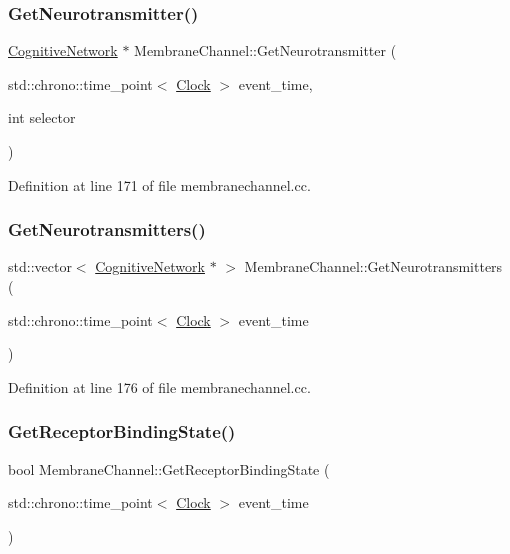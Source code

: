 \subsubsection{\texorpdfstring{Get\+Neurotransmitter()}{GetNeurotransmitter()}}
{\footnotesize\ttfamily \mbox{\hyperlink{class_cognitive_network}{Cognitive\+Network}} $\ast$ Membrane\+Channel\+::\+Get\+Neurotransmitter (\begin{DoxyParamCaption}\item[{std\+::chrono\+::time\+\_\+point$<$ \mbox{\hyperlink{universe_8h_a0ef8d951d1ca5ab3cfaf7ab4c7a6fd80}{Clock}} $>$}]{event\+\_\+time,  }\item[{int}]{selector }\end{DoxyParamCaption})}



Definition at line 171 of file membranechannel.\+cc.

\mbox{\label{class_membrane_channel_a9fdb20eb7d3f9ebad864d07aaa835716}} 
\subsubsection{\texorpdfstring{Get\+Neurotransmitters()}{GetNeurotransmitters()}}
{\footnotesize\ttfamily std\+::vector$<$ \mbox{\hyperlink{class_cognitive_network}{Cognitive\+Network}} $\ast$ $>$ Membrane\+Channel\+::\+Get\+Neurotransmitters (\begin{DoxyParamCaption}\item[{std\+::chrono\+::time\+\_\+point$<$ \mbox{\hyperlink{universe_8h_a0ef8d951d1ca5ab3cfaf7ab4c7a6fd80}{Clock}} $>$}]{event\+\_\+time }\end{DoxyParamCaption})}



Definition at line 176 of file membranechannel.\+cc.

\mbox{\label{class_membrane_channel_a8eb115e2583e5bf0f37156f1fc974aa6}} 
\subsubsection{\texorpdfstring{Get\+Receptor\+Binding\+State()}{GetReceptorBindingState()}}
{\footnotesize\ttfamily bool Membrane\+Channel\+::\+Get\+Receptor\+Binding\+State (\begin{DoxyParamCaption}\item[{std\+::chrono\+::time\+\_\+point$<$ \mbox{\hyperlink{universe_8h_a0ef8d951d1ca5ab3cfaf7ab4c7a6fd80}{Clock}} $>$}]{event\+\_\+time }\end{DoxyParamCaption})\hspace{0.3cm}{\ttfamily [inline]}}



